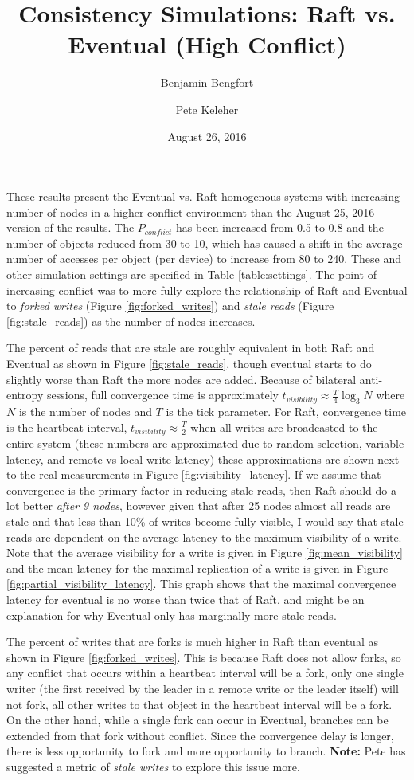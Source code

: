 \documentclass[11pt,letterpaper]{article}
\title{Consistency Simulations: Raft vs. Eventual (High Conflict)}
\date{August 26, 2016}
\author[ ]{Benjamin Bengfort}
\author[ ]{Pete Keleher}
\affil[ ]{Department of Computer Science}
\affil[ ]{University of Maryland}
\affil[ ]{\textit{\{bengfort,keleher\}@cs.umd.edu}}
\begin{document}
\maketitle

These results present the Eventual vs. Raft homogenous systems with increasing number of nodes in a higher conflict environment than the August 25, 2016 version of the results. The $P_{conflict}$ has been increased from 0.5 to 0.8 and the number of objects reduced from 30 to 10, which has caused a shift in the average number of accesses per object (per device) to increase from 80 to 240. These and other simulation settings are specified in Table \ref{table:settings}. The point of increasing conflict was to more fully explore the relationship of Raft and Eventual to \textit{forked writes} (Figure \ref{fig:forked_writes}) and \textit{stale reads} (Figure \ref{fig:stale_reads}) as the number of nodes increases.

The percent of reads that are stale are roughly equivalent in both Raft and Eventual as shown in Figure \ref{fig:stale_reads}, though eventual starts to do slightly worse than Raft the more nodes are added. Because of bilateral anti-entropy sessions, full convergence time is approximately $t_{visibility} \approx \frac{T}{4} \log_3N$ where $N$ is the number of nodes and $T$ is the tick parameter. For Raft, convergence time is the heartbeat interval, $t_{visibility} \approx \frac{T}{2}$ when all writes are broadcasted to the entire system (these numbers are approximated due to random selection, variable latency, and remote vs local write latency) these approximations are shown next to the real measurements in Figure \ref{fig:visibility_latency}. If we assume that convergence is the primary factor in reducing stale reads, then Raft should do a lot better \textit{after 9 nodes}, however given that after 25 nodes almost all reads are stale and that less than 10\% of writes become fully visible, I would say that stale reads are dependent on the average latency to the maximum visibility of a write. Note that the average visibility for a write is given in Figure \ref{fig:mean_visibility} and the mean latency for the maximal replication of a write is given in Figure \ref{fig:partial_visibility_latency}. This graph shows that the maximal convergence latency for eventual is no worse than twice that of Raft, and might be an explanation for why Eventual only has marginally more stale reads.

The percent of writes that are forks is much higher in Raft than eventual as shown in Figure \ref{fig:forked_writes}. This is because Raft does not allow forks, so any conflict that occurs within a heartbeat interval will be a fork, only one single writer (the first received by the leader in a remote write or the leader itself) will not fork, all other writes to that object in the heartbeat interval will be a fork. On the other hand, while a single fork can occur in Eventual, branches can be extended from that fork without conflict. Since the convergence delay is longer, there is less opportunity to fork and more opportunity to branch. \textbf{Note:} Pete has suggested a metric of \textit{stale writes} to explore this issue more.
\end{document}
